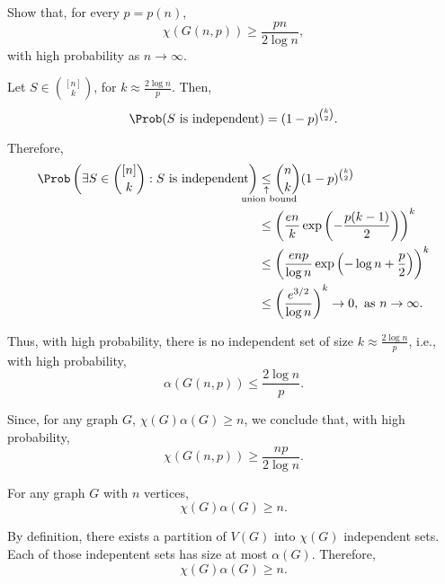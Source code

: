 \documentclass[10pt, a4paper]{article}
\newcommand{\signexpl}[3]{%
  \underset{\substack{\uparrow\\\mathrlap{\text{\hspace{#3}#2}}}}{#1}}
\begin{document}
\newpage
\begin{prob}
	Show that, for every $p = p(n)$, \[
		\chi(G(n, p)) \ge \frac{pn}{2\log n},
	\]
	with high probability as $n \to \infty$.
\end{prob}
\begin{sol}
	Let $S \in \binom{[n]}{k}$, for $k \approx \frac{2\log n}{p}$. Then, \[
		\Prob(S\text{ is independent}) = (1-p)^{\binom{k}{2}}.
	\]

	Therefore,
	\begin{align*}
		\Prob\left(\exists S \in \binom{[n]}{k} : S\text{ is independent}\right)
		&\signexpl{\le}{union bound}{-2.5em} \binom{n}{k}(1-p)^{\binom{k}{2}}\\
		&\le \left(\frac{en}{k} \exp\left(-\frac{p(k-1)}{2}\right)\right)^k\\
		&\le \left(\frac{enp}{\log n} \exp\left(-\log n + \frac{p}{2}\right)\right)^k\\
		&\le \left(\frac{e^{3/2}}{\log n}\right)^k \to 0,\text{ as }n\to\infty.
	\end{align*}

	Thus, with high probability, there is no independent set of size $k \approx \frac{2\log n}{p}$, i.e., with high probability, \[
		\alpha(G(n, p)) \le \frac{2\log n}{p}.
	\]

	Since, for any graph $G$, $\chi(G) \alpha(G) \ge n$, we conclude that, with high probability,  \[
		\chi(G(n, p)) \ge \frac{np}{2\log n}.
	\]

\end{sol}

\begin{lem}
	For any graph $G$ with $n$ vertices, \[
		\chi(G) \alpha(G) \ge n.
	\]
\end{lem}
\begin{dem}
	By definition, there exists a partition of $V(G)$ into $\chi(G)$ independent sets. Each of those indepentent sets has size at most $\alpha(G)$. Therefore, \[
		\chi(G) \alpha(G) \ge n.
	\] 
\end{dem}
\end{document}
